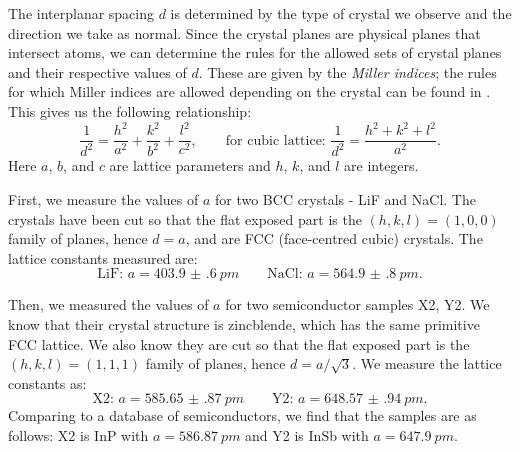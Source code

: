 \documentclass[11pt,a4paper,twoside,onecolumn]{article}
\begin{document}
The interplanar spacing $d$ is determined by the type of crystal we observe and the direction we take as normal. Since the crystal planes are physical planes that intersect atoms, we can determine the rules for the allowed sets of crystal planes and their respective values of $d$. These are given by the \emph{Miller indices}; the rules for which Miller indices are allowed depending on the crystal can be found in \cite{OxfPhys2010}. This gives us the following relationship:
\begin{equation}
    \frac{1}{d^2} = \frac{h^2}{a^2} + \frac{k^2}{b^2} + \frac{l^2}{c^2}, \qquad \text{for cubic lattice: } \frac{1}{d^2} = \frac{h^2 + k^2 + l^2}{a^2}.
\end{equation}
Here $a$, $b$, and $c$ are lattice parameters and $h$, $k$, and $l$ are integers.

First, we measure the values of $a$ for two BCC crystals - LiF and NaCl. The crystals have been cut so that the flat exposed part is the $\left(h,k,l\right) = \left(1,0,0\right)$ family of planes, hence $d = a$, and are FCC (face-centred cubic) crystals. The lattice constants measured are:
\begin{equation}
    \text{LiF: } a = \qty{403.9(6)}{pm} \qquad \text{NaCl: } a = \qty{564.9(8)}{pm}.
\end{equation}

Then, we measured the values of $a$ for two semiconductor samples X2, Y2. We know that their crystal structure is zincblende, which has the same primitive FCC lattice. We also know they are cut so that the flat exposed part is the $\left(h,k,l\right) = \left(1,1,1\right)$ family of planes, hence $d = a / \sqrt{3}$. We measure the lattice constants as:
\begin{equation}
    \text{X2: } a = \qty{585.65(87)}{pm} \qquad \text{Y2: } a = \qty{648.57(94)}{pm}.
\end{equation}
Comparing to a database of semiconductors, we find that the samples are as follows: X2 is InP with $a = \qty{586.87}{pm}$ and Y2 is InSb with $a = \qty{647.9}{pm}$.
\end{document}
